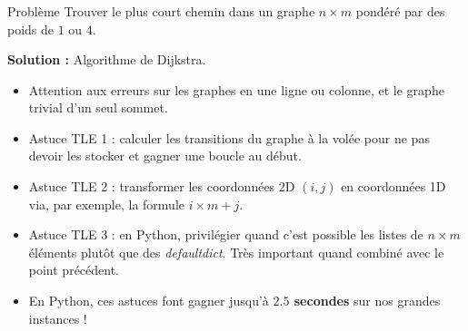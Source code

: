 \begin{frame}
    \frametitle{\problemtitle}
    \begin{block}{Problème}
        Trouver le plus court chemin dans un graphe $n \times m$ pondéré par des poids de $1$ ou $4$.
    \end{block}
    \pause
    \textbf{Solution :} Algorithme de Dijkstra.
    \pause
    \begin{itemize}[<+->]
        \item Attention aux erreurs sur les graphes en une ligne ou colonne, et le graphe trivial d'un seul sommet.
        \item Astuce TLE 1 : calculer les transitions du graphe à la volée pour ne pas devoir les stocker et gagner une boucle au début.
        \item Astuce TLE 2 : transformer les coordonnées 2D $(i,j)$ en coordonnées 1D via, par exemple, la formule $i \times m + j$.
        \item Astuce TLE 3 : en Python, privilégier quand c'est possible les listes de $n \times m$ éléments plutôt que des \emph{defaultdict}. Très important quand combiné avec le point précédent.
        \item En Python, ces astuces font gagner jusqu'à \textbf{$2.5$ secondes} sur nos grandes instances !
    \end{itemize}

\end{frame}